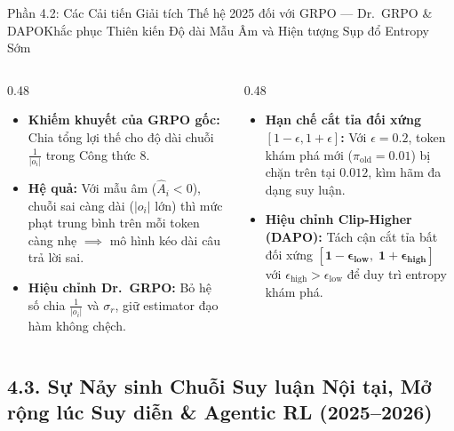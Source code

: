 \begin{frame}{Phần 4.2: Các Cải tiến Giải tích Thế hệ 2025 đối với GRPO --- Dr.\ GRPO \& DAPO}{Khắc phục Thiên kiến Độ dài Mẫu Âm và Hiện tượng Sụp đổ Entropy Sớm}
  \begin{columns}[T,onlytextwidth]
    \begin{column}{0.48\textwidth}
      \footnotesize
      \begin{itemize}\setlength{\itemsep}{5pt}
        \item \textbf{Khiếm khuyết của GRPO gốc:} Chia tổng lợi thế cho độ dài chuỗi $\frac{1}{|o_i|}$ trong Công thức 8.
        \item \textbf{Hệ quả:} Với mẫu âm ($\hat{A}_i < 0$), chuỗi sai càng dài ($|o_i|$ lớn) thì mức phạt trung bình trên mỗi token càng nhẹ $\implies$ mô hình kéo dài câu trả lời sai.
        \item \textbf{Hiệu chỉnh Dr.\ GRPO:} Bỏ hệ số chia $\frac{1}{|o_i|}$ và $\sigma_r$, giữ estimator đạo hàm không chệch.
      \end{itemize}
    \end{column}
    \begin{column}{0.48\textwidth}
      \footnotesize
      \begin{itemize}\setlength{\itemsep}{5pt}
        \item \textbf{Hạn chế cắt tỉa đối xứng $[1-\epsilon, 1+\epsilon]$:} Với $\epsilon = 0.2$, token khám phá mới ($\pi_{\text{old}} = 0.01$) bị chặn trên tại $0.012$, kìm hãm đa dạng suy luận.
        \item \textbf{Hiệu chỉnh Clip-Higher (DAPO):} Tách cận cắt tỉa bất đối xứng $\mathbf{[1 - \epsilon_{\text{low}}, \; 1 + \epsilon_{\text{high}}]}$ với $\epsilon_{\text{high}} > \epsilon_{\text{low}}$ để duy trì entropy khám phá.
      \end{itemize}
    \end{column}
  \end{columns}
\end{frame}

\subsection{4.3. Sự Nảy sinh Chuỗi Suy luận Nội tại, Mở rộng lúc Suy diễn \& Agentic RL (2025--2026)}


